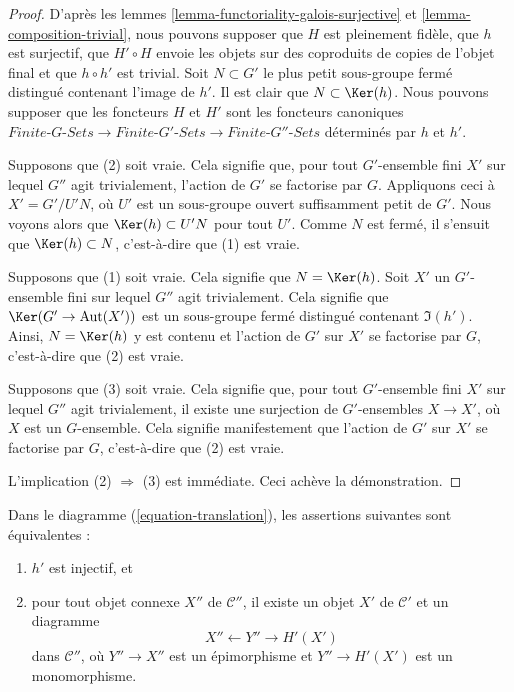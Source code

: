 \begin{proof}
D'après les lemmes \ref{lemma-functoriality-galois-surjective} et
\ref{lemma-composition-trivial}, nous pouvons supposer que
$H$ est pleinement fidèle, que $h$ est surjectif, que $H' \circ H$ envoie les
objets sur des coproduits de copies de l'objet final et que $h \circ h'$
est trivial. Soit $N \subset G'$ le plus petit sous-groupe fermé distingué
contenant l'image de $h'$. Il est clair que
$N \subset \Ker(h)$.
Nous pouvons supposer que les foncteurs $H$ et $H'$ sont les foncteurs canoniques
$\textit{Finite-}G\textit{-Sets} \to \textit{Finite-}G'\textit{-Sets}
\to \textit{Finite-}G''\textit{-Sets}$ déterminés par $h$ et $h'$.

\medskip\noindent
Supposons que (2) soit vraie. Cela signifie que, pour tout $G'$-ensemble fini $X'$
sur lequel $G''$ agit trivialement, l'action de $G'$ se factorise par $G$.
Appliquons ceci à $X' = G'/U'N$, où $U'$ est un sous-groupe ouvert suffisamment petit de $G'$.
Nous voyons alors que $\Ker(h) \subset U'N$ pour tout $U'$. Comme $N$ est fermé,
il s'ensuit que $\Ker(h) \subset N$, c'est-à-dire que (1) est vraie.

\medskip\noindent
Supposons que (1) soit vraie. Cela signifie que $N = \Ker(h)$. Soit $X'$ un
$G'$-ensemble fini sur lequel $G''$ agit trivialement. Cela signifie que
$\Ker(G' \to \text{Aut}(X'))$ est un sous-groupe fermé distingué contenant
$\Im(h')$. Ainsi, $N = \Ker(h)$ y est contenu et l'action de $G'$
sur $X'$ se factorise par $G$, c'est-à-dire que (2) est vraie.

\medskip\noindent
Supposons que (3) soit vraie. Cela signifie que, pour tout $G'$-ensemble fini $X'$
sur lequel $G''$ agit trivialement, il existe une surjection de $G'$-ensembles
$X \to X'$, où $X$ est un $G$-ensemble. Cela signifie manifestement que l'action de
$G'$ sur $X'$ se factorise par $G$, c'est-à-dire que (2) est vraie.

\medskip\noindent
L'implication (2) $\Rightarrow$ (3) est immédiate. Ceci achève la démonstration.
\end{proof}

\begin{lemma}
\label{lemma-functoriality-galois-injective}
Dans le diagramme (\ref{equation-translation}), les assertions suivantes sont équivalentes :
\begin{enumerate}
\item $h'$ est injectif, et
\item pour tout objet connexe $X''$ de $\mathcal{C}''$,
il existe un objet $X'$ de $\mathcal{C}'$ et un diagramme
$$
X'' \leftarrow Y'' \rightarrow H'(X')
$$
dans $\mathcal{C}''$, où $Y'' \to X''$ est un épimorphisme et
$Y'' \to H'(X')$ est un monomorphisme.
\end{enumerate}
\end{lemma}

